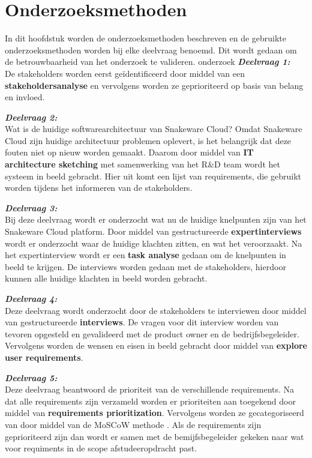 \section{Onderzoeksmethoden}
In dit hoofdstuk worden de onderzoeksmethoden beschreven en de gebruikte onderzoeksmethoden worden bij elke deelvraag benoemd.
Dit wordt gedaan om de betrouwbaarheid van het onderzoek te valideren.
onderzoek
\whitespace[2]
\textit{\textbf{Deelvraag 1:} \SubquestionOne} \\
De stakeholders worden eerst geïdentificeerd door middel van een \textbf{stakeholdersanalyse} en vervolgens worden ze geprioriteerd op basis van belang en invloed.

\whitespace[2]
\textit{\textbf{Deelvraag 2:} \SubquestionTwo} \\
Wat is de huidige softwarearchitectuur van Snakeware Cloud?
Omdat Snakeware Cloud zijn huidige architectuur problemen oplevert, is het belangrijk dat deze fouten niet op nieuw worden gemaakt.
Daarom door middel van \textbf{IT architecture sketching} met samenwerking van het R\&D team wordt het systeem in beeld gebracht.
Hier uit komt  een lijst van requirements, die gebruikt worden tijdens het informeren van de stakeholders.

\whitespace[2]
\textit{\textbf{Deelvraag 3:} \SubquestionThree} \\
Bij deze deelvraag wordt er onderzocht wat nu de huidige knelpunten zijn van het Snakeware Cloud platform.
Door middel van gestructureerde \textbf{expertinterviews} wordt er onderzocht waar de huidige klachten zitten, en wat het veroorzaakt.
Na het expertinterview wordt er een \textbf{task analyse} gedaan om de knelpunten in beeld te krijgen.
De interviews worden gedaan met de stakeholders, hierdoor kunnen alle huidige klachten in beeld worden gebracht.

\whitespace[2]
\textit{\textbf{Deelvraag 4:} \SubquestionFour} \\
Deze deelvraag wordt onderzocht door de stakeholders te interviewen door middel van gestructureerde \textbf{interviews}. 
De vragen voor dit interview worden van tevoren opgesteld en gevalideerd met de product owner en de bedrijfsbegeleider.
Vervolgens worden de wensen en eisen in beeld gebracht door middel van \textbf{explore user requirements}.

\whitespace[2]
\textit{\textbf{Deelvraag 5:} \SubquestionFive} \\
Deze deelvraag beantwoord de prioriteit van de verschillende requirements.
Na dat alle requirements zijn verzameld worden er prioriteiten aan toegekend door middel van \textbf{requirements prioritization}.
Vervolgens worden ze  gecategoriseerd van door middel van de MoSCoW methode \Parencite{MoSCoW}. 
Als de requirements zijn geprioriteerd zijn dan wordt er samen met de bemijfsbegeleider gekeken naar wat voor requiments in de scope afstudeeropdracht past.
